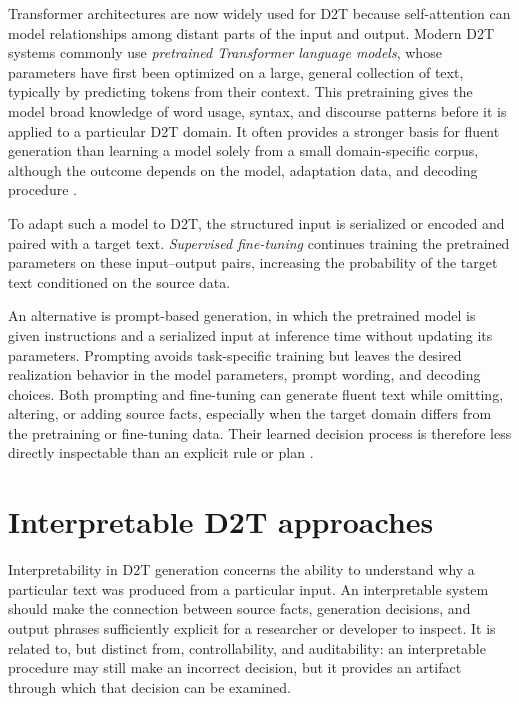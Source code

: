 Transformer architectures are now widely used for D2T because self-attention
can model relationships among distant parts of the input and output. Modern D2T
systems commonly use \emph{pretrained Transformer language models}, whose
parameters have first been optimized on a large, general collection of text,
typically by predicting tokens from their context. This pretraining gives the
model broad knowledge of word usage, syntax, and discourse patterns before it is
applied to a particular D2T domain. It often provides a stronger basis for
fluent generation than learning a model solely from a small domain-specific
corpus, although the outcome depends on the model, adaptation data, and decoding
procedure
\cite{osuji2024systematic,kasner2024beyond}.

To adapt such a model to D2T, the structured input is serialized or encoded and
paired with a target text. \emph{Supervised fine-tuning} continues training the
pretrained parameters on these input--output pairs, increasing the probability
of the target text conditioned on the source data.

An alternative is prompt-based generation, in which the pretrained model is
given instructions and a serialized input at inference time without updating its
parameters. Prompting avoids task-specific training but leaves the desired
realization behavior in the model parameters, prompt wording, and decoding
choices. Both prompting and fine-tuning can generate fluent text while omitting,
altering, or adding source facts, especially when the target domain differs from
the pretraining or fine-tuning data. Their learned decision process is therefore
less directly inspectable than an explicit rule or plan
\cite{osuji2024systematic,kasner2024beyond}.

\section{Interpretable D2T approaches}
\label{sec:interpretable-d2t}

Interpretability in D2T generation concerns the ability to understand why a
particular text was produced from a particular input. An interpretable system
should make the connection between source facts, generation decisions, and
output phrases sufficiently explicit for a researcher or developer to inspect.
It is related to, but distinct from, controllability, and
auditability: an interpretable procedure may still make an incorrect decision,
but it provides an artifact through which that decision can be examined.

